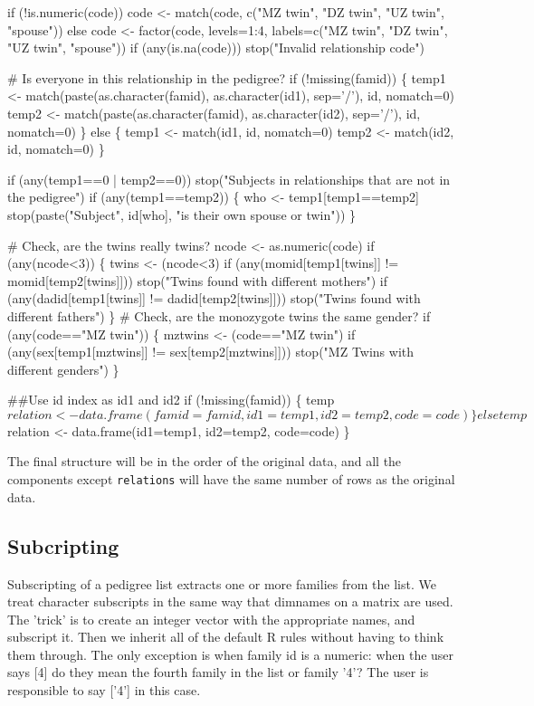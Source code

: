 \documentclass{article}
\begin{document}
    if (!is.numeric(code))
        code <- match(code, c("MZ twin", "DZ twin", "UZ twin", "spouse"))
    else code <- factor(code, levels=1:4,
                        labels=c("MZ twin", "DZ twin", "UZ twin", "spouse"))
    if (any(is.na(code)))
        stop("Invalid relationship code")
     
    # Is everyone in this relationship in the pedigree?
    if (!missing(famid)) \{
        temp1 <- match(paste(as.character(famid), as.character(id1), sep='/'), 
                       id, nomatch=0)
        temp2 <- match(paste(as.character(famid), as.character(id2), sep='/'),
                       id, nomatch=0)
        \}
    else \{
        temp1 <- match(id1, id, nomatch=0)
        temp2 <- match(id2, id, nomatch=0)
        \}
    
    if (any(temp1==0 | temp2==0))
        stop("Subjects in relationships that are not in the pedigree")
    if (any(temp1==temp2)) \{
        who <- temp1[temp1==temp2]
        stop(paste("Subject", id[who], "is their own spouse or twin"))
        \}

    # Check, are the twins really twins?
    ncode <- as.numeric(code)
    if (any(ncode<3)) \{
        twins <- (ncode<3)
        if (any(momid[temp1[twins]] != momid[temp2[twins]]))
            stop("Twins found with different mothers")
        if (any(dadid[temp1[twins]] != dadid[temp2[twins]]))
            stop("Twins found with different fathers")
        \}
    # Check, are the monozygote twins the same gender?
    if (any(code=="MZ twin")) \{
        mztwins <- (code=="MZ twin")
        if (any(sex[temp1[mztwins]] != sex[temp2[mztwins]]))
            stop("MZ Twins with different genders")
        \}

    ##Use id index as id1 and id2
    if (!missing(famid)) \{
        temp$relation <- data.frame(famid=famid, id1=temp1, id2=temp2, code=code)
         
        \}
    else temp$relation <- data.frame(id1=temp1, id2=temp2, code=code)
    \}
\nwendcode{}\nwdocspar

The final structure will be in the order of the original data, and all the
components except {\tt{}relations} will have the
same number of rows as the original data.


\subsection{Subcripting}

Subscripting of a pedigree list extracts one or more families from the
list.  We treat character subscripts in the same way that dimnames on
a matrix are used.  
The 'trick' is to create an integer vector with the appropriate names,
and subscript it.  Then we inherit all of the default R rules without
having to think them through.
The only exception is when family id is a numeric: when the user
says [4] do they mean the fourth family in the list or family '4'?
The user is responsible to say ['4'] in this case.
\end{document}
